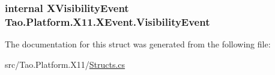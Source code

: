 \label{struct_tao_1_1_platform_1_1_x11_1_1_x_event_a6b0d6275dfeb6ca31babcaf70978304b}
\hypertarget{struct_tao_1_1_platform_1_1_x11_1_1_x_event_a25bf163da670f4aca331c592e6703ad6}{
\subsubsection[{VisibilityEvent}]{\setlength{\rightskip}{0pt plus 5cm}internal {\bf XVisibilityEvent} {\bf Tao.Platform.X11.XEvent.VisibilityEvent}}}
\label{struct_tao_1_1_platform_1_1_x11_1_1_x_event_a25bf163da670f4aca331c592e6703ad6}


The documentation for this struct was generated from the following file:\begin{DoxyCompactItemize}
\item 
src/Tao.Platform.X11/\hyperlink{_structs_8cs}{Structs.cs}\end{DoxyCompactItemize}
